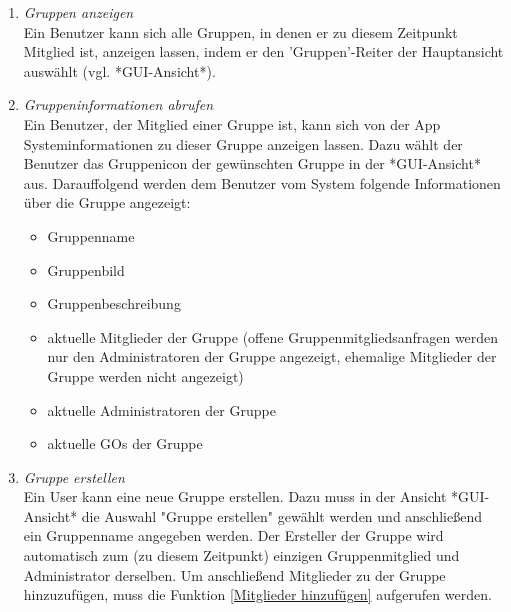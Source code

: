\documentclass[parskip=full]{scrartcl}
\def\threedigits#1{%
  \ifnum#1<100 0\fi
  \ifnum#1<10 0\fi
  \number#1}
\begin{document}
\begin{enumerate}[label={\textbf{/F\protect\threedigits{\theenumi}0/}}, leftmargin=*, resume]
	\item \textit{Gruppen anzeigen}\label{Gruppen anzeigen} \\ %
	Ein Benutzer kann sich alle Gruppen, in denen er zu diesem Zeitpunkt Mitglied ist, anzeigen lassen, indem er den 'Gruppen'-Reiter der \gls{Hauptansicht} auswählt (vgl. *GUI-Ansicht*).
	
	\item \textit{Gruppeninformationen abrufen}\label{Gruppeninfo anzeigen} \\%
	Ein Benutzer, der Mitglied einer Gruppe ist, kann sich von der App Systeminformationen zu dieser Gruppe anzeigen lassen. Dazu wählt der Benutzer das Gruppenicon der gewünschten Gruppe in der *GUI-Ansicht* aus. Darauffolgend werden dem Benutzer vom System folgende Informationen über die Gruppe angezeigt:
	\begin{itemize}
		\item Gruppenname
		\item \colorbox{shadecolor}{Gruppenbild}
		\item \colorbox{shadecolor}{Gruppenbeschreibung}
		\item aktuelle Mitglieder der Gruppe (offene Gruppenmitgliedsanfragen werden nur den Administratoren der Gruppe angezeigt, ehemalige Mitglieder der Gruppe werden nicht angezeigt)
		\item aktuelle Administratoren der Gruppe
		\item aktuelle \glspl{GO} der Gruppe %
	\end{itemize}
	
	\item \textit{Gruppe erstellen}\label{Gruppe erstellen}\\
	Ein User kann eine neue Gruppe erstellen. Dazu muss in der Ansicht *GUI-Ansicht* die Auswahl "Gruppe erstellen" gewählt werden und anschließend ein Gruppenname angegeben werden. Der Ersteller der Gruppe wird automatisch zum (zu diesem Zeitpunkt) einzigen Gruppenmitglied und Administrator derselben. Um anschließend Mitglieder zu der Gruppe hinzuzufügen, muss die Funktion \ref{Mitglieder hinzufügen} aufgerufen werden.
	

\end{enumerate}
\end{document}

